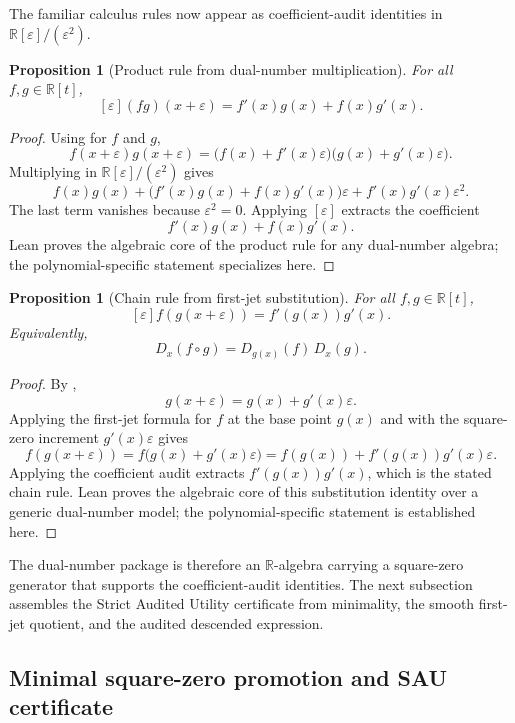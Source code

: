 \documentclass[11pt]{article}
\newcommand{\R}{\mathbb R}
\newcommand{\Dual}{\R[\varepsilon]/(\varepsilon^2)}
\newtheorem{proposition}[theorem]{Proposition}
\theoremstyle{definition}
\begin{document}
The familiar calculus rules now appear as coefficient-audit identities in
\(\Dual\).

\begin{proposition}[Product rule from dual-number multiplication]
\label{prop:jet-product-rule}
For all \(f,g\in\mathbb R[t]\),
\[
[\varepsilon](fg)(x+\varepsilon)
=
f'(x)g(x)+f(x)g'(x).
\]
\end{proposition}

\begin{proof}
Using  for \(f\) and \(g\),
\[
f(x+\varepsilon)g(x+\varepsilon)
=
\bigl(f(x)+f'(x)\varepsilon\bigr)
\bigl(g(x)+g'(x)\varepsilon\bigr).
\]
Multiplying in \(\Dual\) gives
\[
f(x)g(x)+\bigl(f'(x)g(x)+f(x)g'(x)\bigr)\varepsilon
+f'(x)g'(x)\varepsilon^2.
\]
The last term vanishes because \(\varepsilon^2=0\).  Applying
\([\varepsilon]\) extracts the coefficient
\[
f'(x)g(x)+f(x)g'(x).
\]
Lean proves the algebraic core of the product rule for any dual-number algebra;
the polynomial-specific statement specializes here.
\end{proof}

\begin{proposition}[Chain rule from first-jet substitution]
\label{prop:jet-chain-rule}
For all \(f,g\in\mathbb R[t]\),
\[
[\varepsilon]f(g(x+\varepsilon))
=
f'(g(x))g'(x).
\]
Equivalently,
\[
D_x(f\circ g)=D_{g(x)}(f)\,D_x(g).
\]
\end{proposition}

\begin{proof}
By ,
\[
g(x+\varepsilon)=g(x)+g'(x)\varepsilon.
\]
Applying the first-jet formula for \(f\) at the base point \(g(x)\) and with
the square-zero increment \(g'(x)\varepsilon\) gives
\[
f(g(x+\varepsilon))
=
f\bigl(g(x)+g'(x)\varepsilon\bigr)
=
f(g(x))+f'(g(x))g'(x)\varepsilon.
\]
Applying the coefficient audit extracts \(f'(g(x))g'(x)\), which is the stated
chain rule.  Lean proves the algebraic core of this substitution identity over
a generic dual-number model; the polynomial-specific statement is established
here.
\end{proof}

The dual-number package is therefore an \(\R\)-algebra carrying a square-zero
generator that supports the coefficient-audit identities.  The next subsection
assembles the Strict Audited Utility certificate from minimality, the smooth
first-jet quotient, and the audited descended expression.

\subsection{Minimal square-zero promotion and SAU certificate}
\label{subsec:jet-minimal-package-certificate}
\end{document}

